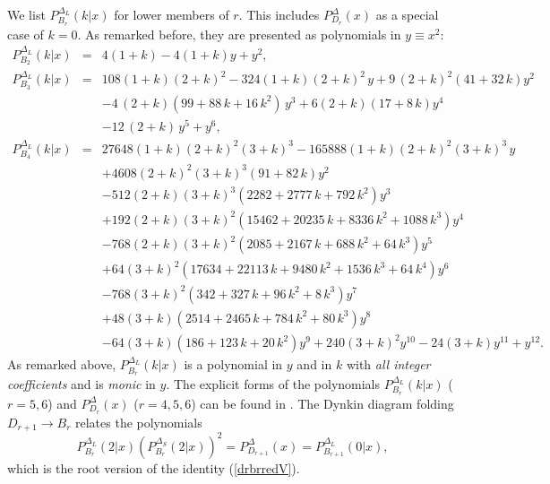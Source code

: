\documentclass[a4paper,12pt]{article}
\begin{document}
We list $P_{B_r}^{\Delta_L}(k|x)$ for lower members of $r$. This includes
$P_{D_r}^{\Delta}(x)$ as a special case of $k=0$. As remarked before,
they are presented as polynomials in $y\equiv x^2$:
\begin{eqnarray}
   P_{B_2}^{\Delta_L}(k|x)&\!\!=\!\!&4(1+k)-4(1+k)y+y^2,\\
%
   P_{B_3}^{\Delta_L}(k|x)&\!\!=\!\!&
   108\left( 1 + k \right){\left( 2 + k \right) }^2 -
   324\left( 1 + k \right){\left( 2 + k \right)}^2\,y +
   9\,{\left( 2 + k \right) }^2\left( 41 + 32\,k \right)
   y^2\nonumber\\
   && - 4\,\left( 2 + k \right)
   \left( 99 + 88\,k + 16\,k^2 \right) \,y^3 +
   6\left( 2 + k \right)\left( 17 + 8\,k \right) y^4\nonumber\\
   && - 12\,\left( 2 + k \right) \,y^5 + y^6,\\
%
   P_{B_4}^{\Delta_L}(k|x)&\!\!=\!\!&
   27648\left( 1 + k \right){\left( 2 + k \right) }^2
   {\left( 3 + k \right) }^3 -
   165888\left( 1 + k \right){\left( 2 + k \right) }^2
   {\left( 3 + k \right) }^3\,y\nonumber\\
   && + 4608{\left( 2 + k \right) }^2
   {\left( 3 + k \right) }^3\left( 91 + 82\,k \right) y^2\nonumber\\
   && - 512\left( 2 + k \right){\left( 3 + k \right)}^3
   \left( 2282 + 2777\,k + 792\,k^2 \right)y^3\nonumber\\
   && + 192\left( 2 + k \right){\left( 3 + k \right) }^2%
   \left( 15462 + 20235\,k + 8336\,k^2 + 1088\,k^3 \right)%
   y^4\nonumber\\
   && - 768\left( 2 + k \right)%
   {\left( 3 + k \right) }^2%
   \left( 2085 + 2167\,k + 688\,k^2 + 64\,k^3 \right)y^5\nonumber\\
   && + 64{\left( 3 + k \right) }^2%
   \left( 17634 + 22113\,k + 9480\,k^2 + 1536\,k^3 +
   64\,k^4 \right)y^6\nonumber\\
   && - 768{\left( 3 + k \right) }^2%
   \left( 342 + 327\,k + 96\,k^2 + 8\,k^3 \right)y^7\nonumber\\
   && + 48\left( 3 + k \right)%
   \left( 2514 + 2465\,k + 784\,k^2 + 80\,k^3 \right)y^8\\
   && - 64\left( 3 + k \right)%
   \left( 186 + 123\,k + 20\,k^2 \right)y^9 +
   240{\left( 3 + k \right) }^2y^{10} -
   24\left( 3 + k \right)y^{11} + y^{12}.\nonumber
\end{eqnarray}
As remarked above, $P_{B_r}^{\Delta_L}(k|x)$ is a polynomial in $y$ and
in $k$ with {\em all integer coefficients\/} and is {\em monic\/} in $y$.
The explicit forms of the polynomials $P_{B_r}^{\Delta_L}(k|x)$ ($r=5,6$)
and $P_{D_r}^{\Delta}(x)$ ($r=4,5,6$) can be found in \cite{poly}.
The Dynkin diagram folding $D_{r+1}\to B_r$ relates the polynomials
\begin{equation}
   P_{B_r}^{\Delta_L}(2|x)\left(P_{B_r}^{\Delta_S}(2|x)\right)^2=
   P_{D_{r+1}}^{\Delta}(x)=P_{B_{r+1}}^{\Delta_L}(0|x),
\label{tdrbrredV}
\end{equation}
which is the  root version of the identity (\ref{drbrredV}).
\end{document}
